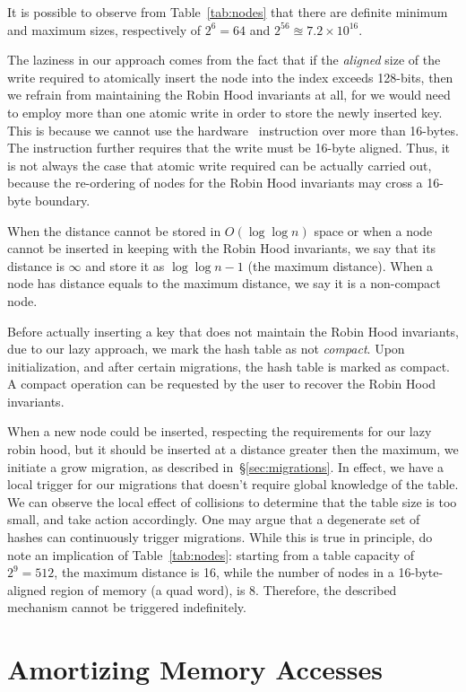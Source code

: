 It is possible to observe from Table~\ref{tab:nodes} that there are definite minimum and maximum sizes, respectively of $2^{6} = 64$ and $2^{56} \approxeq 7.2 \times 10^{16}$.

The laziness in our approach comes from the fact that if the \emph{aligned} size of the write required to atomically insert the node into the index exceeds 128-bits, then we refrain from maintaining the Robin Hood invariants at all, for we would need to employ more than one atomic write in order to store the newly inserted key.
This is because we cannot use the hardware~\cite[CMPXCHG--Compare and Exchange]{x86-64} instruction over more than 16-bytes.
The instruction further requires that the write must be 16-byte aligned.
Thus, it is not always the case that atomic write required can be actually carried out, because the re-ordering of nodes for the Robin Hood invariants may cross a 16-byte boundary.

When the distance cannot be stored in $O(\log \log n)$ space or when a node cannot be inserted in keeping with the Robin Hood invariants, we say that its distance is $\infty$ and store it as $\log \log n - 1$ (the maximum distance).
When a node has distance equals to the maximum distance, we say it is a non-compact node.

Before actually inserting a key that does not maintain the Robin Hood invariants, due to our lazy approach, we mark the hash table as not \emph{compact}.
Upon initialization, and after certain migrations, the hash table is marked as compact.
A compact operation can be requested by the user to recover the Robin Hood invariants.

When a new node could be inserted, respecting the requirements for our lazy robin hood, but it should be inserted at a distance greater then the maximum, we initiate a grow migration, as described in~\S\ref{sec:migrations}.
In effect, we have a local trigger for our migrations that doesn't require global knowledge of the table.
We can observe the local effect of collisions to determine that the table size is too small, and take action accordingly.
One may argue that a degenerate set of hashes can continuously trigger migrations.
While this is true in principle, do note an implication of Table~\ref{tab:nodes}: starting from a table capacity of $2^9 = 512$, the maximum distance is 16, while the number of nodes in a 16-byte-aligned region of memory (a quad word), is 8.
Therefore, the described mechanism cannot be triggered indefinitely.


\section{Amortizing Memory Accesses}\label{sec:amortizing-memory-accesses}

